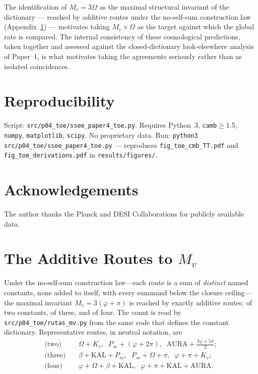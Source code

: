 \documentclass[12pt,a4paper]{article}
\begin{document}
The identification of $M_v=3\Omega$ as the maximal structural
invariant of the dictionary --- reached by  additive routes under the
no-self-sum construction law (Appendix~\ref{app:independence}) --- motivates taking
$M_v \times \Omega$ as the target against which the global rate is compared.
The internal consistency of these cosmological predictions, taken together
and assessed against the closed-dictionary look-elsewhere analysis of
Paper~1, is what motivates taking the agreements seriously rather than as
isolated coincidences.

\section*{Reproducibility}

Script: \texttt{src/p04\_toe/ssee\_paper4\_toe.py}.
Requires Python~3, \texttt{camb}$\geq$1.5, \texttt{numpy}, \texttt{matplotlib},
\texttt{scipy}.  No proprietary data.
Run: \texttt{python3 src/p04\_toe/ssee\_paper4\_toe.py} --- reproduces
\texttt{fig\_toe\_cmb\_TT.pdf} and \texttt{fig\_toe\_derivations.pdf}
in \texttt{results/figures/}.

\section*{Acknowledgements}
The author thanks the Planck and DESI Collaborations for publicly available data.

\appendix
\section{The Additive Routes to \texorpdfstring{$M_v$}{M_v}}
\label{app:independence}

Under the no-self-sum construction law---each route is a sum of \emph{distinct}
named constants, none added to itself, with every summand below the closure
ceiling---the maximal invariant $M_v=3(\varphi+\pi)$ is reached by
exactly \emph{} additive routes:  of two constants,  of three,
and  of four. The count is read by \texttt{src/p04\_toe/rutas\_mv.py} from the
same code that defines the constant dictionary. Representative routes, in neutral notation, are
\begin{align}
\text{(two)}\quad   & \Omega+K_v,\;\; P_{sc}+(\varphi+2\pi),\;\; \mathrm{AURA}+\tfrac{3\varphi+5\pi}{2}; \nonumber\\
\text{(three)}\quad & \beta+\mathrm{KAL}+P_{sc},\;\; P_{sc}+\Omega+\pi,\;\; \varphi+\pi+K_v; \nonumber\\
\text{(four)}\quad  & \varphi+\Omega+\beta+\mathrm{KAL},\;\; \varphi+\pi+\mathrm{KAL}+\mathrm{AURA}. \nonumber
\end{align}
\end{document}
